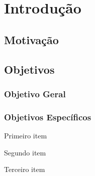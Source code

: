 \chapter{Introdução}
\label{cap:introducao}

\section{Motivação}
\label{sec:motivacao}


\section{Objetivos}
\label{sec:objetivos}


\subsection{Objetivo Geral}
\label{sec:objetivo-geral}


\subsection{Objetivos Específicos}
\label{sec:objetivos-especificos}


	\begin{alineas}
		\item Primeiro item
		\item Segundo item
		\item Terceiro item
	\end{alineas}